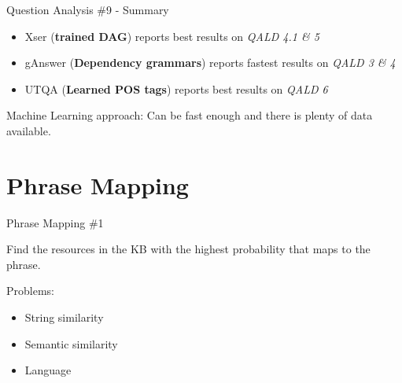 \documentclass{beamer}
\begin{document}
\begin{frame}{Question Analysis \#9 - Summary}
  \begin{card}
    \begin{itemize}
      \item Xser (\textbf{trained DAG}) reports best results on \textit{QALD 4.1 \& 5}
      \item gAnswer (\textbf{Dependency grammars}) reports fastest results on \textit{QALD 3 \& 4}
      \item UTQA (\textbf{Learned POS tags}) reports best results on \textit{QALD 6}
    \end{itemize}
    Machine Learning approach: Can be fast enough and there is plenty of data available.
  \end{card}
\end{frame}

\note{}

\section{Phrase Mapping}

\begin{frame}{Phrase Mapping \#1}
  \begin{card}
    Find the resources in the KB with the highest probability that maps to the phrase.
  \end{card}
  \begin{card}
    Problems:
    \begin{itemize}
      \item String similarity
      \item Semantic similarity
      \item Language
    \end{itemize}
  \end{card}
\end{frame}

\end{document}
